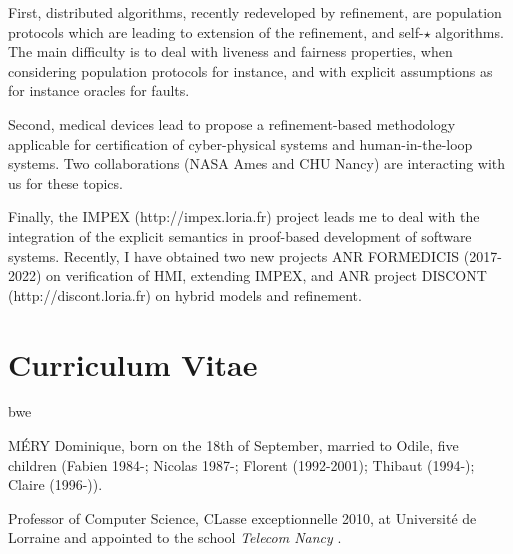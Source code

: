 \documentclass[ 12pt]{article}
\begin{document}
  First, distributed  algorithms,  recently redeveloped by refinement,
  are population protocols  which  are  leading  to extension  of  the
  refinement,  and self-$\star$ algorithms. The  main difficulty is to
  deal    with liveness   and   fairness properties,  when  considering
  population protocols for  instance, and with explicit assumptions as for instance 
  oracles for faults.

  Second,   medical  devices  lead  to propose a  refinement-based methodology
  applicable  for   certification    of  cyber-physical  systems   and
  human-in-the-loop  systems.  Two   collaborations (NASA Ames and  CHU
  Nancy) are interacting with us for these topics.



Finally, the IMPEX (http://impex.loria.fr) project leads me to deal with the integration of
the explicit semantics in  proof-based development of software
systems. Recently, I have obtained two new projects ANR FORMEDICIS
(2017-2022) on verification of HMI, extending IMPEX, and ANR project
DISCONT (http://discont.loria.fr)  on hybrid models and  refinement.







\section{Curriculum Vitae}
\newcommand{\nancyIesial}{\ca{Universit\'{e} de Nancy I~:~Ecole sup\'{e}rieure d'informatique appliqu\'{e}e de Lorraine}}
\newcommand{\inancyIesial}{Universit\'{e} Henri Poincar\'e -  Nancy I}
\newcommand{\nancyIesstin}{\ca{Universit\'{e} de Nancy I~(Ecole sup\'{e}rieure des sciences et technologies de l'ing\'{e}nieur de Nancy)}}
\newcommand{\inancyIesstin}{Universit\'{e} de Nancy I~(Ecole sup\'{e}rieure des sciences et technologies de l'ing\'{e}nieur de Nancy)}

\newcommand{\inpl}{Institut National Polytechnique de Lorraine}

\newcommand{\pr}{Professeur des Universit\'es, section 27 du CNU,}bwe 

\noindent
M\'ERY Dominique,  born on  the  18th of  September,   married to
Odile, five   children     (Fabien 1984-; Nicolas    1987-;    Florent
(1992-2001); Thibaut (1994-); Claire (1996-)).

\noindent
Professor of Computer Science, CLasse exceptionnelle 2010,    at Universit\'e de Lorraine and appointed to the  school \textit{Telecom Nancy }.
\end{document}
